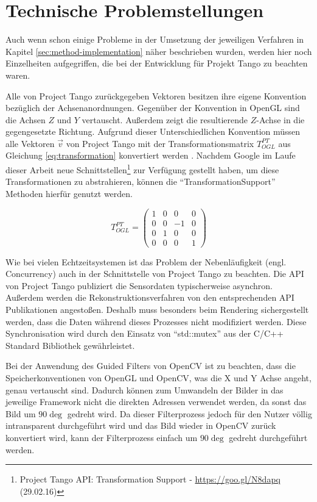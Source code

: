 \section{Technische Problemstellungen}

Auch wenn schon einige Probleme in der Umsetzung der jeweiligen Verfahren in Kapitel \ref{sec:method-implementation} näher beschrieben wurden, werden hier noch Einzelheiten aufgegriffen, die bei der Entwicklung für Projekt Tango zu beachten waren. 

Alle von Project Tango zurückgegeben Vektoren besitzen ihre eigene Konvention bezüglich der Achsenanordnungen. Gegenüber der Konvention in OpenGL sind die Achsen \(Z\) und \(Y\) vertauscht. Außerdem zeigt die resultierende \(Z\)-Achse in die gegengesetzte Richtung. Aufgrund dieser Unterschiedlichen Konvention müssen alle Vektoren \(\vec{v}\) von Project Tango mit der Transformationsmatrix \(T_{OGL}^{PT}\) aus Gleichung \ref{eq:transformation} konvertiert werden \citep{Proje15:online}. Nachdem Google im Laufe dieser Arbeit neue Schnittstellen\footnote{Project Tango API: Transformation Support - \url{https://goo.gl/N8dapq} (29.02.16)} zur Verfügung gestellt haben, um diese Transformationen zu abstrahieren, können die \enquote{TransformationSupport} Methoden hierfür genutzt werden.

\begin{equation} \label{eq:transformation}
T_{OGL}^{PT} =\left( \begin{matrix} 1&0&0&0\\0&0&-1&0\\0&1&0&0\\0&0&0&1 \end{matrix} \right)
\end{equation}

Wie bei vielen Echtzeitsystemen ist das Problem der Nebenläufigkeit (engl. Concurrency) auch in der Schnittstelle von Project Tango zu beachten. Die API von Project Tango publiziert die Sensordaten typischerweise asynchron. Außerdem werden die Rekonstruktionsverfahren von den entsprechenden API Publikationen angestoßen. Deshalb muss besonders beim Rendering sichergestellt werden, dass die Daten während dieses Prozesses nicht modifiziert werden. Diese Synchronisation wird durch den Einsatz von \enquote{std::mutex} aus der C/C++ Standard Bibliothek gewährleistet. 

Bei der Anwendung des Guided Filters von OpenCV ist zu beachten, dass die  Speicherkonventionen von OpenGL und OpenCV, was die X und Y Achse angeht, genau vertauscht sind. Dadurch können zum Umwandeln der Bilder in das jeweilige Framework nicht die direkten Adressen verwendet werden, da sonst das Bild um \(90\deg\) gedreht wird. Da dieser Filterprozess jedoch für den Nutzer völlig intransparent durchgeführt wird und das Bild wieder in OpenCV zurück konvertiert wird, kann der Filterprozess einfach um \(90\deg\) gedreht durchgeführt werden.
